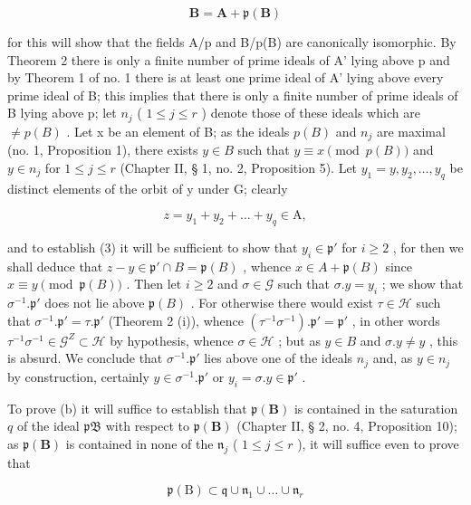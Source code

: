 \[
\mathbf {B} = \mathbf {A} + \mathfrak {p} (\mathbf {B})\tag{3}
\]

for this will show that the fields A/p and B/p(B) are canonically isomorphic. By Theorem 2 there is only a finite number of prime ideals of A' lying above p and by Theorem 1 of no. 1 there is at least one prime ideal of A' lying above every prime ideal of B; this implies that there is only a finite number of prime ideals of B lying above p; let \(n_{j}\) ( \(1 \leqslant j \leqslant r\) ) denote those of these ideals which are \(\neq p(B)\) . Let x be an element of B; as the ideals \(p(B)\) and \(n_{j}\) are maximal (no. 1, Proposition 1), there exists \(y \in B\) such that \(y \equiv x \pmod{p(B)}\) and \(y \in n_{j}\) for \(1 \leqslant j \leqslant r\) (Chapter II, § 1, no. 2, Proposition 5). Let \(y_{1} = y, y_{2}, \ldots, y_{q}\) be distinct elements of the orbit of y under G; clearly

\[
z = y _ {1} + y _ {2} + \dots + y _ {q} \in \mathrm{A},
\]

and to establish (3) it will be sufficient to show that \(y_i \in \mathfrak{p}'\) for \(i \geqslant 2\) , for then we shall deduce that \(z - y \in \mathfrak{p}' \cap B = \mathfrak{p}(B)\) , whence \(x \in A + \mathfrak{p}(B)\) since \(x \equiv y \pmod{\mathfrak{p}(B)}\) . Then let \(i \geqslant 2\) and \(\sigma \in \mathcal{G}\) such that \(\sigma.y = y_i\) ; we show that \(\sigma^{-1}. \mathfrak{p}'\) does not lie above \(\mathfrak{p}(B)\) . For otherwise there would exist \(\tau \in \mathcal{H}\) such that \(\sigma^{-1}. \mathfrak{p}' = \tau. \mathfrak{p}'\) (Theorem 2 (i)), whence \((\tau^{-1}\sigma^{-1}). \mathfrak{p}' = \mathfrak{p}'\) , in other words \(\tau^{-1}\sigma^{-1} \in \mathcal{G}^{Z} \subset \mathcal{H}\) by hypothesis, whence \(\sigma \in \mathcal{H}\) ; but as \(y \in B\) and \(\sigma.y \neq y\) , this is absurd. We conclude that \(\sigma^{-1}. \mathfrak{p}'\) lies above one of the ideals \(n_j\) and, as \(y \in n_j\) by construction, certainly \(y \in \sigma^{-1}. \mathfrak{p}'\) or \(y_i = \sigma.y \in \mathfrak{p}'\) .

To prove (b) it will suffice to establish that \(\mathfrak{p}(\mathbf{B})\) is contained in the saturation \(q\) of the ideal \(\mathfrak{pB}\) with respect to \(\mathfrak{p}(\mathbf{B})\) (Chapter II, § 2, no. 4, Proposition 10); as \(\mathfrak{p}(\mathbf{B})\) is contained in none of the \(\mathfrak{n}_j\) ( \(1 \leqslant j \leqslant r\) ), it will suffice even to prove that

\[
\mathfrak {p} (\mathrm{B}) \subset \mathfrak {q} \cup \mathfrak {n} _ {1} \cup \dots \cup \mathfrak {n} _ {r}\tag{4}
\]

